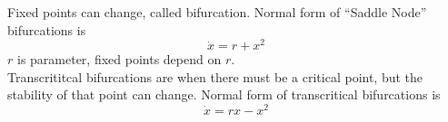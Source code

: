 \documentclass{article}
\date{Winter Semester 2022}
\author{\EC}
\begin{document}
\maketitle
Fixed points can change, called bifurcation. Normal form of ``Saddle Node'' bifurcations is $$\dot{x}=r+x^2$$
$r$ is parameter, fixed points depend on $r$.
\\
Transcrititcal bifurcations are when there must be a critical point, but the stability of that point can change. Normal form of transcritical bifurcations is 
$$\dot{x}=rx-x^2$$
\end{document}
